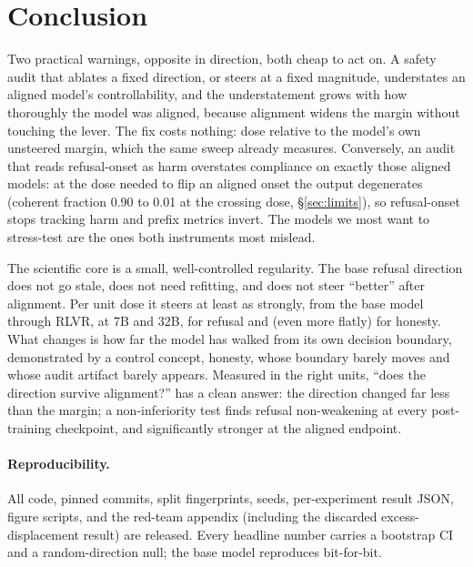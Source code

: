 \documentclass{article}
\begin{document}
\section{Conclusion}\label{sec:conclusion}
Two practical warnings, opposite in direction, both cheap to act on. A safety audit that ablates a
fixed direction, or steers at a fixed magnitude, understates an aligned model's controllability, and
the understatement grows with how thoroughly the model was aligned, because alignment widens the
margin without touching the lever. The fix costs nothing: dose relative to the model's own unsteered
margin, which the same sweep already measures. Conversely, an audit that reads refusal-onset as harm
overstates compliance on exactly those aligned models: at the dose needed to flip an aligned onset
the output degenerates (coherent fraction \num{0.90} to \num{0.01} at the crossing dose,
\S\ref{sec:limits}), so refusal-onset stops tracking harm and prefix metrics invert. The models we most want to stress-test are the ones both instruments most
mislead.

The scientific core is a small, well-controlled regularity. The base refusal direction does not go
stale, does not need refitting, and does not steer ``better'' after alignment. Per unit dose it
steers at least as strongly, from the base model through RLVR, at 7B and 32B, for refusal and (even
more flatly) for honesty. What changes is how far the model has walked from its own decision
boundary, demonstrated by a control concept, honesty, whose boundary barely moves and whose audit
artifact barely appears. Measured in the right units, ``does the direction survive alignment?'' has
a clean answer: the direction changed far less than the margin; a non-inferiority test finds refusal non-weakening at every post-training checkpoint, and significantly stronger at the aligned endpoint.

\paragraph{Reproducibility.} All code, pinned commits, split fingerprints, seeds, per-experiment
result JSON, figure scripts, and the red-team appendix (including the discarded excess-displacement
result) are released. Every headline number carries a bootstrap CI and a random-direction null; the
base model reproduces bit-for-bit.




\appendix


\end{document}

